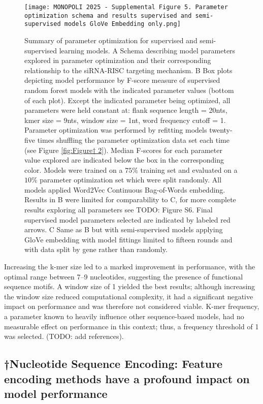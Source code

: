 \documentclass{report}
\begin{document}
\begin{figure}
    \centering
    \texttt{[image: MONOPOLI 2025 - Supplemental Figure 5. Parameter optimization schema and results supervised and semi-supervised models GloVe Embedding only.png]}
    \caption{Summary of parameter optimization for supervised and semi-supervised learning models. A Schema describing model parameters explored in parameter optimization and their corresponding relationship to the siRNA-RISC targeting mechanism. B Box plots depicting model performance by F-score measure of supervised random forest models with the indicated parameter values (bottom of each plot). Except the indicated parameter being optimized, all parameters were held constant at: flank sequence length = 20nts, kmer size = 9nts, window size = 1nt, word frequency cutoff = 1. Parameter optimization was performed by refitting models twenty-five times shuffling the parameter optimization data set each time (see Figure \ref{fig:Figure† 2}). Median F-scores for each parameter value explored are indicated below the box in the corresponding color. Models were trained on a $75\%$ training set and evaluated on a $10\%$ parameter optimization set which were split randomly. All models applied Word2Vec Continuous Bag-of-Words embedding. Results in B were limited for comparability to C, for more complete results exploring all parameters see TODO: Figure S6. Final supervised model parameters selected are indicated by labeled red arrows. C Same as B but with semi-supervised models applying GloVe embedding with model fittings limited to fifteen rounds and with data split by gene rather than randomly.
}
    \label{fig:Figure† S5}
\end{figure}

Increasing the k-mer size led to a marked improvement in performance, with the optimal range between 7–9 nucleotides, suggesting the presence of functional sequence motifs. A window size of 1 yielded the best results; although increasing the window size reduced computational complexity, it had a significant negative impact on performance and was therefore not considered viable. K-mer frequency, a parameter known to heavily influence other sequence-based models, had no measurable effect on performance in this context; thus, a frequency threshold of 1 was selected.  (TODO: add references).



\subsection{†Nucleotide Sequence Encoding: Feature encoding methods have a profound impact on model performance}\label{sec:nucleotide sequence encoding†}
\end{document}
